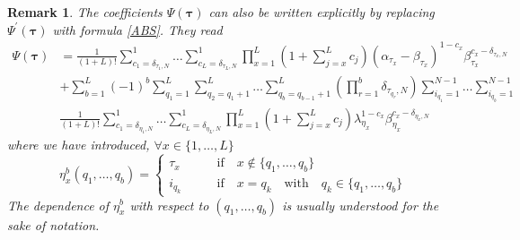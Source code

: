 \documentclass[10pt]{article}
\numberwithin{equation}{section}
\numberwithin{equation}{subsection}
\newtheorem{remark}{Remark}
\begin{document}
\begin{remark}
The coefficients $\Psi(\bm{\tau})$ can also be written explicitly by replacing $\Psi^{'}(\bm{\tau})$ with formula \eqref{ABS}. They read 
\begin{equation}
	\begin{split}
		\Psi(\bm{\tau})&=\frac{1}{(1+L)!}\sum_{c_{1}=\delta_{\tau_{1},N}}^{1}\ldots\sum_{c_{L}=\delta_{\tau_{L},N}}^{1}\prod_{x=1}^{L}\left(1+\sum_{j=x}^{L}c_{j}\right)(\alpha_{\tau_{x}}-\beta_{\tau_{x}})^{1-c_{x}}\beta_{\tau_{x}}^{c_{x}-\delta_{\tau_{x},N}}
		\\&+
		\sum_{b=1}^{L}(-1)^{b}\sum_{q_{1}=1}^{L}\sum_{q_{2}=q_{1}+1}^{L}\ldots\sum_{q_{b}=q_{b-1}+1}^{L}\left(\prod_{r=1}^{b}\delta_{\tau_{q_{r}},N}\right) 
		\sum_{i_{q_{1}}=1}^{N-1}\ldots\sum_{i_{q_{b}}=1}^{N-1}
		\\&
	\frac{1}{(1+L)!}\sum_{c_{1}=\delta_{\eta_{1},N}}^{1}\ldots\sum_{c_{L}=\delta_{\eta_{L},N}}^{1}\prod_{x=1}^{L}\left(1+\sum_{j=x}^{L}c_{j}\right)\lambda_{\eta_{x}}^{1-c_{x}}\beta_{\eta_{x}}^{c_{x}-\delta_{\eta_{x},N}}
	\end{split}
\end{equation}
where we have introduced, $\forall x\in \{1,\ldots,L\}$
\begin{equation}\label{eta-notation}
	\eta_{x}^{b}(q_{1},\ldots,q_{b})=\begin{cases}
		\tau_{x}\qquad &\text{if}\quad x\notin \{q_{1},\ldots,q_{b}\}\\
		i_{q_{k}}\qquad &\text{if}\quad x=q_{k}\quad \text{with}\quad q_{k}\in\{q_{1},\ldots,q_{b}\}
	\end{cases}%
	\end{equation}
	The dependence of $\eta_{x}^{b}$ with respect to $(q_{1},\ldots,q_{b})$ is usually understood for the sake of notation. 
	\end{remark}
\end{document}
